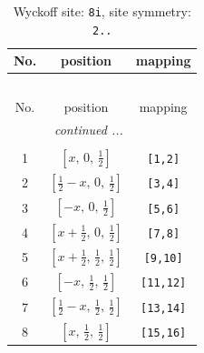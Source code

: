 \documentclass[fleqn,8pt]{jsarticle}
\begin{document}
\renewcommand{\arraystretch}{1.2}
\begin{longtable}{ccc}
\caption{Wyckoff site: {\tt 8i}, site symmetry: {\tt 2..}}
 \\
 \hline \hline
No. & position & mapping \\ \hline \endfirsthead

\multicolumn{2}{l}{\tablename\ \thetable{}} \\
 \hline \hline
No. & position & mapping \\ \hline \endhead

 \hline \hline
\multicolumn{2}{r}{\footnotesize\it continued ...} \\ \endfoot

 \hline \hline
\multicolumn{2}{r}{} \\ \endlastfoot

1 & $\left[ x,\, 0,\, \frac{1}{2} \right]$ & {\tt [1,2]} \\ \hline
2 & $\left[ \frac{1}{2} - x,\, 0,\, \frac{1}{2} \right]$ & {\tt [3,4]} \\ \hline
3 & $\left[ - x,\, 0,\, \frac{1}{2} \right]$ & {\tt [5,6]} \\ \hline
4 & $\left[ x + \frac{1}{2},\, 0,\, \frac{1}{2} \right]$ & {\tt [7,8]} \\ \hline
5 & $\left[ x + \frac{1}{2},\, \frac{1}{2},\, \frac{1}{2} \right]$ & {\tt [9,10]} \\ \hline
6 & $\left[ - x,\, \frac{1}{2},\, \frac{1}{2} \right]$ & {\tt [11,12]} \\ \hline
7 & $\left[ \frac{1}{2} - x,\, \frac{1}{2},\, \frac{1}{2} \right]$ & {\tt [13,14]} \\ \hline
8 & $\left[ x,\, \frac{1}{2},\, \frac{1}{2} \right]$ & {\tt [15,16]} \\
\end{longtable}
\renewcommand{\arraystretch}{1.2}
\end{document}
